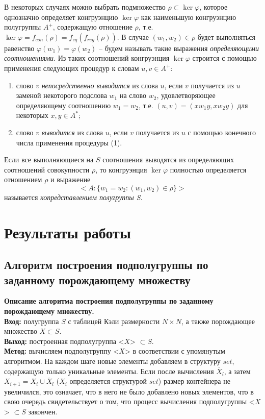 \documentclass[spec, och, otchet, hidelinks]{SCWorks}
\newcommand{\tbf}[1]{\textbf{#1}}
\begin{document}
\par В некоторых случаях можно выбрать подмножество $\rho \subset \ker \varphi$,
которое однозначно определяет конгруэнцию $\ker \varphi$ как наименьшую
конгруэнцию полугруппы $A^{+}$, содержащую отношение $\rho$, т.е. $\ker \varphi
= f_{con}(\rho) = f_{eq}(f_{reg}(\rho))$. В случае $(w_1, w_2) \in \rho$ будет
выполняться равенство $\varphi (w_1) = \varphi (w_2)$ -- будем называть такие
выражения \textit{определяющими соотношениями}. Из таких соотношений конгруэнция
$\ker \varphi$ строится с помощью применения следующих процедур к словам $u, v
\in A^{+}$:
\begin{enumerate}
\item слово $v$ \textit{непосредственно выводится} из слова $u$, если $v$
  получается из $u$ заменой некоторого подслова $w_1$ на слово $w_2$,
  удовлетворяющее определяющему соотношению $w_1 = w_2$, т.е. $(u, v) =
  (xw_1y, xw_2y)$ для некоторых $x, y \in A^{*}$;
\item слово $v$ \textit{выводится} из слова $u$, если $v$ получается из $u$ с
  помощью конечного числа применения процедуры (1).
\end{enumerate}

\par Если все выполняющиеся на $S$ соотношения выводятся из определяющих
соотношений совокупности $\rho$, то конгруэнция $\ker \varphi$ полностью
определяется отношением $\rho$ и выражение $$ <A : \{w_1 = w_2 : (w_1, w_2) \in
\rho\}> $$ называется \textit{копредставлением полугруппы S}.
  
\newpage

\section{Результаты работы}

\subsection{Алгоритм построения подполугруппы по заданному порождающему множеству}
\par \tbf{Описание алгоритма построения подполугруппы по заданному порождающему
  множеству.} \\
\tbf{Вход:} полугруппа $S$ с таблицей Кэли размерности $N \times N$, а также порождающее
множество $X \subset S$. \\
\tbf{Выход:} построенная подполугруппа <$X$> $\subset S$. \\
\tbf{Метод:} вычисляем подполугруппу <$X$> в соответствии с упомянутым
алгоритмом. На каждом шаге новые элементы добавляем в структуру $set$,
содержащую только уникальные элементы. Если после вычисления $\overline X_l$, а
затем $X_{i + 1} = X_i \cup \overline X_l$ ($X_{i}$ определяется структурой
$set$) размер контейнера не увеличился, это означает, что в него не было
добавлено новых элементов, что в свою очередь свидетельствует о том, что процесс
вычисления подполугруппы <$X$> $\subset S$ закончен.
\end{document}

